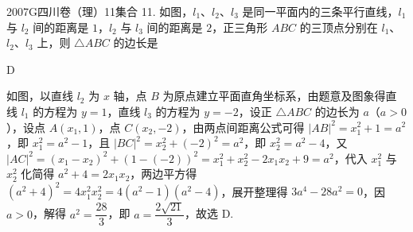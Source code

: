 
\begin{problem}{2007}{G}{四川卷（理）}{11}{集合}
11. 如图，$ l_1 $、$ l_2 $、$ l_3 $ 是同一平面内的三条平行直线，$ l_1 $ 与 $ l_2 $ 间的距离是 $ 1 $，$ l_2 $ 与 $ l_3 $ 间的距离是 $ 2 $，正三角形 $ ABC $ 的三顶点分别在 $ l_1 $、$ l_2 $、$ l_3 $ 上，则 $ \triangle ABC $ 的边长是

\begin{choices}
\end{choices}
\end{problem}

\begin{answer}
D
\end{answer}

\begin{solutions}
如图，以直线 $ l_2 $ 为 $ x $ 轴，点 $ B $ 为原点建立平面直角坐标系，由题意及图象得直线 $ l_1 $ 的方程为 $ y=1 $，直线 $ l_3 $ 的方程为 $ y=-2 $，设正 $ \triangle ABC $ 的边长为 $ a $（$ a>0 $），设点 $ A(x_1,1) $，点 $ C(x_2,-2) $，由两点间距离公式可得 $ |AB|^2=x_1^2+1=a^2 $，即 $ x_1^2=a^2-1 $，且 $ |BC|^2=x_2^2+(-2)^2=a^2 $，即 $ x_2^2=a^2-4 $，又 $ |AC|^2=(x_1-x_2)^2+(1-(-2))^2=x_1^2+x_2^2-2x_1x_2+9=a^2 $，代入 $ x_1^2 $ 与 $ x_2^2 $ 化简得 $ a^2+4=2x_1x_2 $，两边平方得 $ (a^2+4)^2=4x_1^2x_2^2=4(a^2-1)(a^2-4) $，展开整理得 $ 3a^4-28a^2=0 $，因 $ a>0 $，解得 $ a^2=\dfrac{28}{3} $，即 $ a=\dfrac{2\sqrt{21}}{3} $，故选 D.

\end{solutions}
